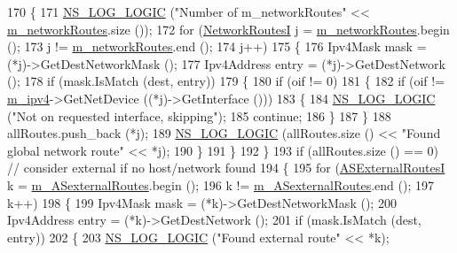 \begin{DoxyCode}
170     \{
171       \hyperlink{group__logging_ga88acd260151caf2db9c0fc84997f45ce}{NS\_LOG\_LOGIC} (\textcolor{stringliteral}{"Number of m\_networkRoutes"} << \hyperlink{classns3_1_1Ipv4GlobalRouting_aef3903663955f6f9a411be06752f3976}{m\_networkRoutes}.size ());
172       \textcolor{keywordflow}{for} (\hyperlink{classns3_1_1Ipv4GlobalRouting_a52c6db3cff38f2600555615bb9840ca5}{NetworkRoutesI} j = \hyperlink{classns3_1_1Ipv4GlobalRouting_aef3903663955f6f9a411be06752f3976}{m\_networkRoutes}.begin (); 
173            j != \hyperlink{classns3_1_1Ipv4GlobalRouting_aef3903663955f6f9a411be06752f3976}{m\_networkRoutes}.end (); 
174            j++) 
175         \{
176           Ipv4Mask mask = (*j)->GetDestNetworkMask ();
177           Ipv4Address entry = (*j)->GetDestNetwork ();
178           \textcolor{keywordflow}{if} (mask.IsMatch (dest, entry)) 
179             \{
180               \textcolor{keywordflow}{if} (oif != 0)
181                 \{
182                   \textcolor{keywordflow}{if} (oif != \hyperlink{classns3_1_1Ipv4GlobalRouting_a8ca97d33982a32fa41a98b56dbec2edc}{m\_ipv4}->GetNetDevice ((*j)->GetInterface ()))
183                     \{
184                       \hyperlink{group__logging_ga88acd260151caf2db9c0fc84997f45ce}{NS\_LOG\_LOGIC} (\textcolor{stringliteral}{"Not on requested interface, skipping"});
185                       \textcolor{keywordflow}{continue};
186                     \}
187                 \}
188               allRoutes.push\_back (*j);
189               \hyperlink{group__logging_ga88acd260151caf2db9c0fc84997f45ce}{NS\_LOG\_LOGIC} (allRoutes.size () << \textcolor{stringliteral}{"Found global network route"} << *j);
190             \}
191         \}
192     \}
193   \textcolor{keywordflow}{if} (allRoutes.size () == 0)  \textcolor{comment}{// consider external if no host/network found}
194     \{
195       \textcolor{keywordflow}{for} (\hyperlink{classns3_1_1Ipv4GlobalRouting_a2f2e1f2c8d631cfd016343f993cf577b}{ASExternalRoutesI} k = \hyperlink{classns3_1_1Ipv4GlobalRouting_ad34f23b0d519a9603b6d9225185fc5ad}{m\_ASexternalRoutes}.begin ();
196            k != \hyperlink{classns3_1_1Ipv4GlobalRouting_ad34f23b0d519a9603b6d9225185fc5ad}{m\_ASexternalRoutes}.end ();
197            k++)
198         \{
199           Ipv4Mask mask = (*k)->GetDestNetworkMask ();
200           Ipv4Address entry = (*k)->GetDestNetwork ();
201           \textcolor{keywordflow}{if} (mask.IsMatch (dest, entry))
202             \{
203               \hyperlink{group__logging_ga88acd260151caf2db9c0fc84997f45ce}{NS\_LOG\_LOGIC} (\textcolor{stringliteral}{"Found external route"} << *k);

\end{DoxyCode}
